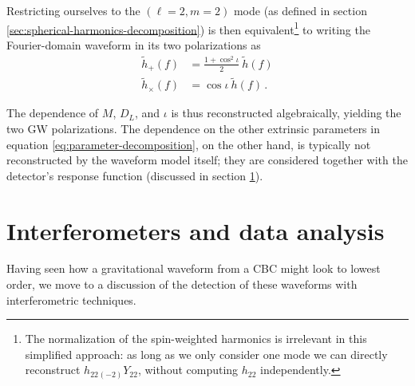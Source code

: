 \documentclass[main.tex]{subfiles}
\begin{document}
Restricting ourselves to the \((\ell=2, m=2)\) mode (as defined in section \ref{sec:spherical-harmonics-decomposition}) is then equivalent\footnote{The normalization of the spin-weighted harmonics is irrelevant in this simplified approach: as long as we only consider one mode we can directly reconstruct \(h_{22} {}_{(-2)}Y_{22}\), without computing \(h_{22}\) independently.} to writing the Fourier-domain waveform in its two polarizations as 
%
\begin{subequations}
\begin{align}
\widetilde{h}_{+}(f) &= \frac{1 + \cos^2 \iota }{2} \ \widetilde{h} (f)  \\
\widetilde{h}_{ \times } (f) &= \cos \iota \ \widetilde{h}(f)
\,.
\end{align}
\end{subequations}

The dependence of \(M\), \(D_L\), and \(\iota\) is thus reconstructed algebraically, yielding the two \ac{GW} polarizations.
The dependence on the other extrinsic parameters in equation \eqref{eq:parameter-decomposition}, on the other hand, is typically not reconstructed by the waveform model itself; they are considered together with the detector's response function (discussed in section \ref{sec:data-analysis}).

\section{Interferometers and data analysis} \label{sec:data-analysis}

Having seen how a gravitational waveform from a \ac{CBC} might look to lowest order, we move to a discussion of the detection of these waveforms with interferometric techniques. 
\end{document}
